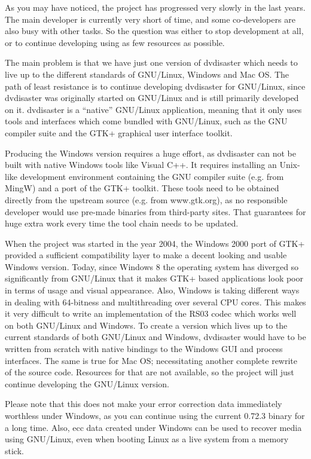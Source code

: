    {\label{qa-discontinued-os}As you may have noticed, the project has progressed very slowly in the
     last years. The main developer is currently very short of time,
     and some co-developers are also busy with other tasks. So the question
     was either to stop development at all, or to continue developing using
     as few resources as possible.

     The main problem is that we have just one version of dvdisaster which
     needs to live up to the different standards of GNU/Linux, Windows and
     Mac OS. The path of least resistance is to continue developing dvdisaster
     for GNU/Linux, since dvdisaster was originally started on GNU/Linux and is
     still primarily developed on it. dvdisaster is a ``native'' GNU/Linux
     application, meaning that it only uses tools and interfaces which come
     bundled with GNU/Linux, such as the GNU compiler suite and the GTK+ graphical
     user interface toolkit.

     \smallskip
     
     Producing the Windows version requires a huge effort, as dvdisaster can not be
     built with native Windows tools like Visual C++. It requires installing an
     Unix-like development environment containing the GNU compiler suite (e.g. from
     MingW) and a port of the GTK+ toolkit. These tools need to be obtained directly
     from the upstream source (e.g. from www.gtk.org), as no responsible developer
     would use pre-made binaries from third-party sites. That guarantees for huge
     extra work every time the tool chain needs to be updated.

     \smallskip
     
     When the project was started in the year 2004, the Windows 2000 port of GTK+
     provided a sufficient compatibility layer to make a decent looking and usable
     Windows version. Today, since Windows 8 the operating system has diverged so
     significantly from GNU/Linux that it makes GTK+ based applications look poor
     in terms of usage and visual appearance. Also, Windows is taking different
     ways in dealing with 64-bitness and multithreading over several CPU cores.
     This makes it very difficult to write an implementation of the RS03 codec
     which works  well on both GNU/Linux and Windows. To create a version
     which lives up to the current standards of both GNU/Linux and Windows,
     dvdisaster would have to be written from scratch with native bindings
     to the Windows GUI and process interfaces. The same is true for Mac OS;
     necessitating another complete rewrite of the source code. Resources for
     that are not available, so the project will just continue developing 
     the GNU/Linux version.

     \smallskip
     
     Please note that this does not make your error correction data immediately
     worthless under Windows, as you can continue using the current 0.72.3 binary
     for a long time. Also, ecc data created under Windows can be used to recover
     media using GNU/Linux, even when booting Linux as a live system from a memory stick.}


